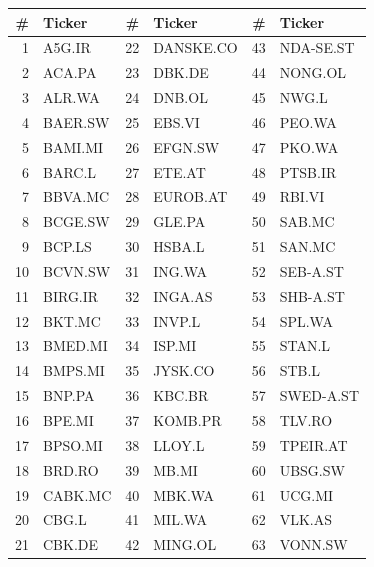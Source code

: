 \documentclass[12pt,a4paper]{article}
\begin{document}
\vspace{4pt}
\begin{center}
\footnotesize
\setlength{\tabcolsep}{5pt}
\begin{tabular}{rl|rl|rl}
\hline
\# & Ticker & \# & Ticker & \# & Ticker \\
\hline
 1 & A5G.IR     & 22 & DANSKE.CO  & 43 & NDA-SE.ST \\
 2 & ACA.PA     & 23 & DBK.DE     & 44 & NONG.OL   \\
 3 & ALR.WA     & 24 & DNB.OL     & 45 & NWG.L     \\
 4 & BAER.SW    & 25 & EBS.VI     & 46 & PEO.WA    \\
 5 & BAMI.MI    & 26 & EFGN.SW    & 47 & PKO.WA    \\
 6 & BARC.L     & 27 & ETE.AT     & 48 & PTSB.IR   \\
 7 & BBVA.MC    & 28 & EUROB.AT   & 49 & RBI.VI    \\
 8 & BCGE.SW    & 29 & GLE.PA     & 50 & SAB.MC    \\
 9 & BCP.LS     & 30 & HSBA.L     & 51 & SAN.MC    \\
10 & BCVN.SW    & 31 & ING.WA     & 52 & SEB-A.ST  \\
11 & BIRG.IR    & 32 & INGA.AS    & 53 & SHB-A.ST  \\
12 & BKT.MC     & 33 & INVP.L     & 54 & SPL.WA    \\
13 & BMED.MI    & 34 & ISP.MI     & 55 & STAN.L    \\
14 & BMPS.MI    & 35 & JYSK.CO    & 56 & STB.L     \\
15 & BNP.PA     & 36 & KBC.BR     & 57 & SWED-A.ST \\
16 & BPE.MI     & 37 & KOMB.PR    & 58 & TLV.RO    \\
17 & BPSO.MI    & 38 & LLOY.L     & 59 & TPEIR.AT  \\
18 & BRD.RO     & 39 & MB.MI      & 60 & UBSG.SW   \\
19 & CABK.MC    & 40 & MBK.WA     & 61 & UCG.MI    \\
20 & CBG.L      & 41 & MIL.WA     & 62 & VLK.AS    \\
21 & CBK.DE     & 42 & MING.OL    & 63 & VONN.SW   \\
\hline
\end{tabular}
\end{center}

\end{document}
